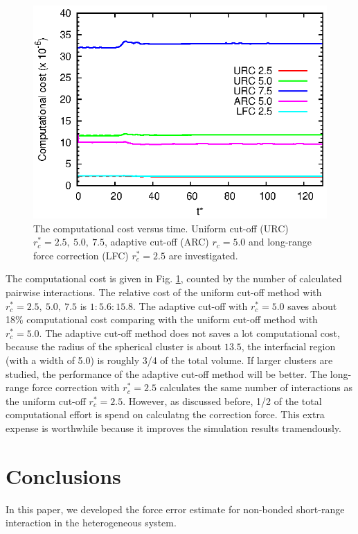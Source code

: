 \documentclass[aps,pre,preprint]{revtex4-1}
\begin{document}
\begin{figure}
  \centering
  \includegraphics[]{fig/cost.eps}
  \caption{The computational cost versus time. Uniform
    cut-off (URC) $r_c^\ast = 2.5,\ 5.0,\ 7.5$, adaptive cut-off (ARC)
    $r_c = 5.0$ and long-range force correction (LFC) $r^\ast_c = 2.5$
    are investigated.}
  \label{fig:tmp13}
\end{figure}

The computational cost is given in Fig. \ref{fig:tmp13}, counted by
the number of calculated pairwise interactions. The relative cost of
the uniform cut-off method with $r_c^\ast = 2.5,\ 5.0,\ 7.5$ is
$1:5.6:15.8$. The adaptive cut-off with $r_c^\ast = 5.0$ saves
about 18\% computational cost comparing with the uniform cut-off
method with $r_c^\ast = 5.0$. The adaptive cut-off method does not
saves a lot computational cost, because the radius of the spherical
cluster is about $13.5$, the interfacial region (with a width of 5.0)
is roughly 3/4 of the total volume. If larger clusters are studied,
the performance of the adaptive cut-off method will be better. The
long-range force correction with $r_c^\ast = 2.5$ calculates the same
number of interactions as the uniform cut-off $r_c^\ast =
2.5$. However, as discussed before, 1/2 of the total computational
effort is spend on calculatng the correction force. This extra expense
is worthwhile because it improves the simulation results tramendously.


\section{Conclusions}\label{sec:conclusion}

In this paper, we developed the force error estimate for non-bonded
short-range interaction in the heterogeneous system. 



{}

\end{document}
